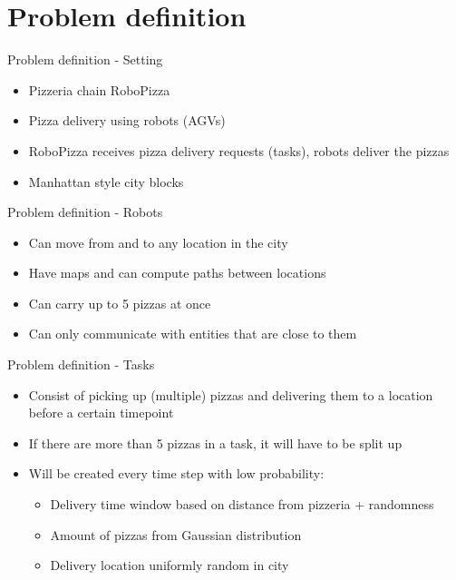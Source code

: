 \section{Problem definition}

\begin{frame}{Problem definition - Setting}
    \begin{itemize}
        \item Pizzeria chain RoboPizza
        \item Pizza delivery using robots (AGVs)
        \item RoboPizza receives pizza delivery requests (tasks), robots deliver the pizzas
        \item Manhattan style city blocks
    \end{itemize}
\end{frame}

\begin{frame}{Problem definition - Robots}
    \begin{itemize}
        \item Can move from and to any location in the city
        \item Have maps and can compute paths between locations
        \item Can carry up to 5 pizzas at once
        \item Can only communicate with entities that are close to them
    \end{itemize}
\end{frame}

\begin{frame}{Problem definition - Tasks}
    \begin{itemize}
        \item Consist of picking up (multiple) pizzas and delivering them to a location before a certain timepoint
        \item If there are more than 5 pizzas in a task, it will have to be split up
        \item Will be created every time step with low probability:
            \begin{itemize}
                \item Delivery time window based on distance from pizzeria + randomness
                \item Amount of pizzas from Gaussian distribution
                \item Delivery location uniformly random in city
            \end{itemize}
    \end{itemize}
\end{frame}

